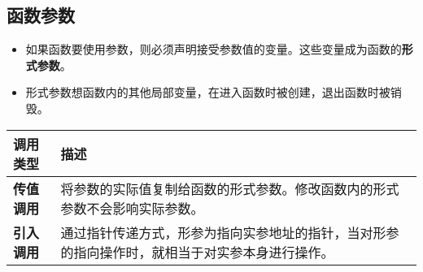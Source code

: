 \documentclass[UTF8]{ctexart}
\begin{document}
	\subsection{函数参数}
	\begin{itemize}
		\item 如果函数要使用参数，则必须声明接受参数值的变量。这些变量成为函数的\textbf{形式参数}。
		\item 形式参数想函数内的其他局部变量，在进入函数时被创建，退出函数时被销毁。
	\end{itemize}
	\begin{tabular*}{\linewidth}{l|p{27em}}
		\toprule
		调用类型 & 描述 \\
		\midrule
		\textbf{传值调用} & 将参数的实际值复制给函数的形式参数。修改函数内的形式参数不会影响实际参数。\\
		\textbf{引入调用} & 通过指针传递方式，形参为指向实参地址的指针，当对形参的指向操作时，就相当于对实参本身进行操作。\\
		\bottomrule
	\end{tabular*}
\end{document}
